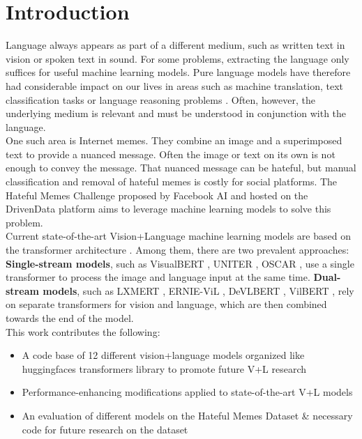 \documentclass{article}
\begin{document}
\section{Introduction}
Language always appears as part of a different medium, such as written text in vision or spoken text in sound. For some problems, extracting the language only suffices for useful machine learning models. Pure language models have therefore had considerable impact on our  lives in areas such as machine translation, text classification tasks or language reasoning problems \cite{brown2005language}. Often, however, the underlying medium is relevant and must be understood in conjunction with the language. \\
One such area is Internet memes. They combine an image and a superimposed text to provide a nuanced message. Often the image or text on its own is not enough to convey the message. That nuanced message can be hateful, but manual classification and removal of hateful memes is costly for social platforms. The Hateful Memes Challenge \cite{kiela2020hateful} proposed by Facebook AI and hosted on the DrivenData platform aims to leverage machine learning models to solve this problem. \\
Current state-of-the-art Vision+Language machine learning models are based on the transformer architecture \cite{vaswani2017attention}. Among them, there are two prevalent approaches:
\textbf{Single-stream models}, such as VisualBERT \cite{li2019visualbert}, UNITER \cite{chen2019uniter}, OSCAR \cite{li2020oscar}, use a single transformer to process the image and language input at the same time.
\textbf{Dual-stream models}, such as LXMERT \cite{tan2019lxmert}, ERNIE-ViL \cite{yu2020ernie}, DeVLBERT \cite{zhang2020devlbert}, VilBERT \cite{lu2019vilbert}, rely on separate transformers for vision and language, which are then combined towards the end of the model. \\
This work contributes the following:
\begin{itemize}
    \item A code base of 12 different vision+language models organized like huggingfaces transformers library \cite{wolf2019huggingface} to promote future V+L research
    \item Performance-enhancing modifications applied to state-of-the-art V+L models
    \item An evaluation of different models on the Hateful Memes Dataset \cite{kiela2020hateful} \& necessary code for future research on the dataset
\end{itemize}
\end{document}
